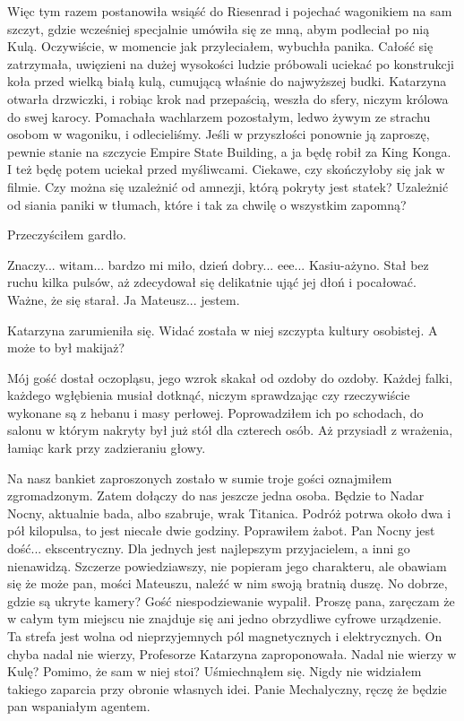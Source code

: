 Więc tym razem postanowiła wsiąść do Riesenrad i pojechać wagonikiem na sam szczyt, gdzie wcześniej specjalnie umówiła się ze mną, abym podleciał po nią Kulą.
Oczywiście, w momencie jak przyleciałem, wybuchła panika. 
Całość się zatrzymała, uwięzieni na dużej wysokości ludzie próbowali uciekać po konstrukcji koła przed wielką białą kulą, cumującą właśnie do najwyższej budki. 
Katarzyna otwarła drzwiczki, i robiąc krok nad przepaścią, weszła do sfery, niczym królowa do swej karocy.
Pomachała wachlarzem pozostałym, ledwo żywym ze strachu osobom w wagoniku, i odlecieliśmy.
Jeśli w przyszłości ponownie ją zaproszę, pewnie stanie na szczycie Empire State Building, a ja będę robił za King Konga.
I też będę potem uciekał przed myśliwcami. Ciekawe, czy skończyłoby się jak w filmie.
Czy można się uzależnić od amnezji, którą pokryty jest statek?
Uzależnić od siania paniki w tłumach, które i tak za chwilę o wszystkim zapomną?

Przeczyściłem gardło.
\begin{dialogue}
\ds{} Znaczy... witam... bardzo mi miło, dzień dobry... eee... Kasiu-ażyno. \dm{} Stał bez ruchu kilka pulsów, aż zdecydował się delikatnie ująć jej dłoń i pocałować.
Ważne, że się starał. \dm{} Ja Mateusz... jestem.
\end{dialogue}

Katarzyna zarumieniła się. Widać została w niej szczypta kultury osobistej. A może to był makijaż?

Mój gość dostał oczopląsu, jego wzrok skakał od ozdoby do ozdoby. 
Każdej falki, każdego wgłębienia musiał dotknąć, niczym sprawdzając czy rzeczywiście wykonane są z hebanu i masy perłowej. 
Poprowadziłem ich po schodach, do salonu w którym nakryty był już stół dla czterech osób.
Aż przysiadł z wrażenia, łamiąc kark przy zadzieraniu głowy.
\begin{dialogue}
\ds{} Na nasz bankiet zaproszonych zostało w sumie troje gości \dm{} oznajmiłem zgromadzonym. \dm{} Zatem dołączy do nas jeszcze jedna osoba.
Będzie to Nadar Nocny, aktualnie bada, albo szabruje, wrak Titanica. Podróż potrwa około dwa i pół kilopulsa, to jest niecałe dwie godziny.
\dm{} Poprawiłem żabot. \dm{}
Pan Nocny jest dość... ekscentryczny. Dla jednych jest najlepszym przyjacielem, a inni go nienawidzą.
Szczerze powiedziawszy, nie popieram jego charakteru, ale obawiam się że może pan, mości Mateuszu, naleźć w nim swoją bratnią duszę.
\ds{} No dobrze, gdzie są ukryte kamery? \dm{} Gość niespodziewanie wypalił.
\ds{} Proszę pana, zaręczam że w całym tym miejscu nie znajduje się ani jedno obrzydliwe cyfrowe urządzenie. 
Ta strefa jest wolna od nieprzyjemnych pól magnetycznych i elektrycznych.
\ds{} On chyba nadal nie wierzy, Profesorze \dm{} Katarzyna zaproponowała. 
\ds{} Nadal nie wierzy w Kulę? Pomimo, że sam w niej stoi? \dm{} Uśmiechnąłem się. \dm{} 
Nigdy nie widziałem takiego zaparcia przy obronie własnych idei. Panie Mechalyczny, ręczę że będzie pan wspaniałym agentem.
\end{dialogue}

